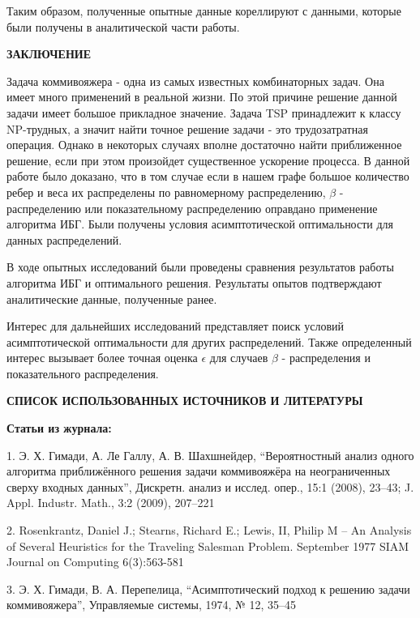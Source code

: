 \documentclass[a4paper, 14pt]{extarticle}
\begin{document}
Таким образом, полученные опытные данные кореллируют с данными, которые были получены в аналитической части работы.

\newpage

\begin{center}
 \textbf{ЗАКЛЮЧЕНИЕ}
\end{center}

Задача коммивояжера - одна из самых известных комбинаторных задач. 
Она имеет много применений в реальной жизни. По этой причине решение данной задачи имеет большое прикладное значение. Задача TSP принадлежит к классу NP-трудных, а значит найти точное решение задачи - это трудозатратная операция. Однако в некоторых случаях вполне достаточно найти приближенное решение, если при этом произойдет существенное ускорение процесса. В данной работе было доказано, что в том случае если в нашем графе большое количество ребер и веса их распределены по равномерному распределению, $\beta$ - распределению или показательному распределению оправдано применение алгоритма ИБГ. Были получены условия асимптотической оптимальности для данных распределений.

В ходе опытных исследований были проведены сравнения результатов работы алгоритма ИБГ и оптимального решения. Результаты опытов подтверждают аналитические данные, полученные ранее.

Интерес для дальнейших исследований представляет поиск условий асимптотической оптимальности для других распределений. Также определенный интерес вызывает более точная оценка $\epsilon$ для случаев $\beta$ - распределения и показательного распределения.



\newpage

\begin{center}
 \textbf{СПИСОК ИСПОЛЬЗОВАННЫХ ИСТОЧНИКОВ И ЛИТЕРАТУРЫ }
\end{center}

\textbf{Статьи из журнала:}

1. 	Э. Х. Гимади, А. Ле Галлу, А. В. Шахшнейдер, “Вероятностный анализ одного алгоритма приближённого решения задачи коммивояжёра на неограниченных сверху входных данных”, Дискретн. анализ и исслед. опер., 15:1 (2008), 23–43; J. Appl. Industr. Math., 3:2 (2009), 207–221

2. Rosenkrantz, Daniel J.; Stearns, Richard E.; Lewis, II, Philip M -- An Analysis of Several Heuristics for the Traveling Salesman Problem. September 1977 SIAM Journal on Computing 6(3):563-581

3. 	Э. Х. Гимади, В. А. Перепелица, “Асимптотический подход к решению задачи коммивояжера”, Управляемые системы, 1974, № 12, 35–45\\
\end{document}
